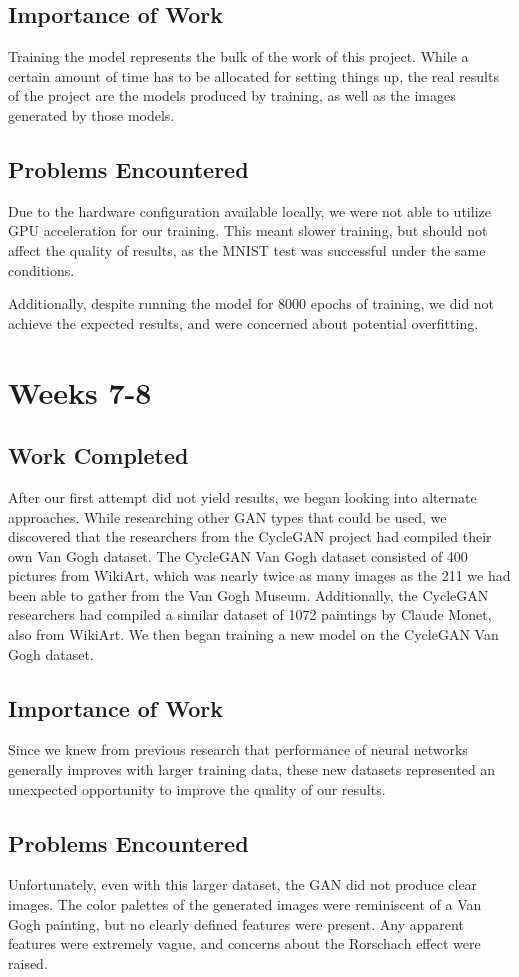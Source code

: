 \documentclass[12pt,letterpaper]{article}
\begin{document}
	\subsection{Importance of Work}
	Training the model represents the bulk of the work of this project. While a certain amount of time has to be allocated for setting things up, the real results of the project are the models produced by training, as well as the images generated by those models.
	\subsection{Problems Encountered}
	Due to the hardware configuration available locally, we were not able to utilize GPU acceleration for our training. This meant slower training, but should not affect the quality of results, as the MNIST test was successful under the same conditions.

	Additionally, despite running the model for 8000 epochs of training, we did not achieve the expected results, and were concerned about potential overfitting.

	\section{Weeks 7-8}
	\subsection{Work Completed}
	After our first attempt did not yield results, we began looking into alternate approaches. While researching other GAN types that could be used, we discovered that the researchers from the CycleGAN\cite{CycleGAN2017}\cite{isola2017image} project had compiled their own Van Gogh dataset. The CycleGAN Van Gogh dataset consisted of 400 pictures from WikiArt\cite{wikiartVanGogh}, which was nearly twice as many images as the 211 we had been able to gather from the Van Gogh Museum. Additionally, the CycleGAN researchers had compiled a similar dataset of 1072 paintings by Claude Monet, also from WikiArt. We then began training a new model on the CycleGAN Van Gogh dataset.
	\subsection{Importance of Work}
	Since we knew from previous research that performance of neural networks generally improves with larger training data, these new datasets represented an unexpected opportunity to improve the quality of our results.
	\subsection{Problems Encountered}
	Unfortunately, even with this larger dataset, the GAN did not produce clear images. The color palettes of the generated images were reminiscent of a Van Gogh painting, but no clearly defined features were present. Any apparent features were extremely vague, and concerns about the Rorschach effect were raised.
\end{document}
